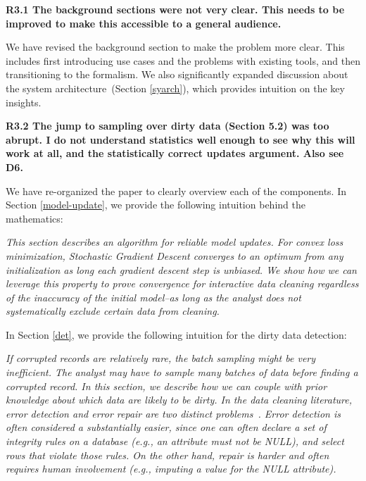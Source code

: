 \noindent\textbf{R3.1 The background sections were not very clear. This needs to be improved
to make this accessible to a general audience.}

\noindent  We have revised the background section to make the problem more clear. This includes first introducing use cases and the problems with existing tools, and then transitioning to the formalism. We also significantly expanded discussion about the system architecture~(Section \ref{syarch}), which provides intuition on the key insights.

\vspace{0.5em}

\noindent\textbf{R3.2 The jump to sampling over dirty data (Section 5.2) was too abrupt.
I do not understand statistics well enough to see why this will work at all,
and the statistically correct updates argument. Also see D6.}

\noindent  We have re-organized the paper to clearly overview each of the components. In Section \ref{model-update}, we provide the following intuition behind the mathematics:

\emph{This section describes an algorithm for reliable model updates.
For convex loss minimization, Stochastic Gradient Descent converges to an optimum from any initialization as long each gradient descent step is unbiased.
We show how we can leverage this property to prove convergence for interactive data cleaning regardless of the inaccuracy of the initial model--as long as the analyst does not systematically exclude certain data from cleaning.} 

\vspace{0.5em}

In Section \ref{det}, we provide the following intuition for the dirty data detection:

\emph{If corrupted records are relatively rare, the batch sampling might be very inefficient.
The analyst may have to sample many batches of data before finding a corrupted record.
In this section, we describe how we can couple \sys with prior knowledge about which data are likely to be dirty.
In the data cleaning literature, error detection and error repair are two distinct problems~\cite{DBLP:series/synthesis/2012Fan, Dasu:2003:EDM:861869, rahm2000data}.
Error detection is often considered a substantially easier, since one can often declare a set of integrity rules on a database (e.g., an attribute must not be NULL), and select rows that violate those rules.
On the other hand, repair is harder and often requires human involvement (e.g., imputing a value for the NULL attribute).}

